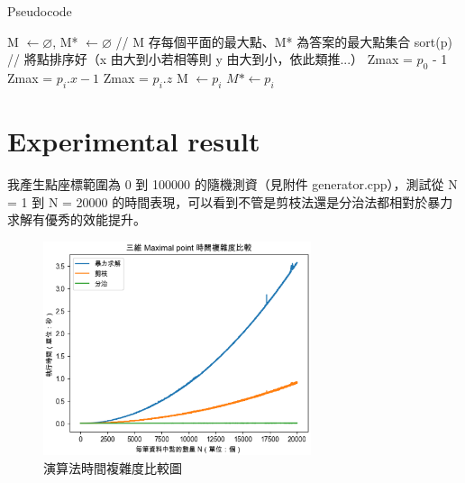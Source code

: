\documentclass[12pt]{article}
\begin{document}
\begin{algorithm}[H]
	\caption{Pseudocode}
	\begin{algorithmic}
		\State M $\leftarrow \varnothing$, M* $\leftarrow \varnothing$ // M 存每個平面的最大點、M* 為答案的最大點集合
		\State sort(p) // 將點排序好（x 由大到小若相等則 y 由大到小，依此類推...）
		\State Zmax = $p_0$ - 1 
				\State Zmax = $p_i.x -1$
			\EndIf
				\State Zmax = $p_i.z$
				\State M $\leftarrow p_i$
			\EndIf
		\EndFor
				\State $M* \leftarrow p_i$
			\EndIf
		\EndFor
	\end{algorithmic}
\end{algorithm}
\part{Experimental result}
我產生點座標範圍為 0 到 100000 的隨機測資（見附件 generator.cpp），測試從 N = 1 到 N = 20000 的時間表現，可以看到不管是剪枝法還是分治法都相對於暴力求解有優秀的效能提升。
\begin{figure}[H]
	\centering
	\includegraphics[width=0.7\textwidth]{time_compare}
	\caption{演算法時間複雜度比較圖} %
	\label{Fig.main1} %
\end{figure}
\end{document}
